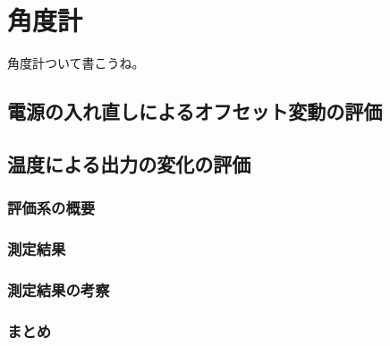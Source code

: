 \documentclass[../../main.tex]{subfiles}
\begin{document}
\chapter{角度計}
角度計ついて書こうね。
\section{電源の入れ直しによるオフセット変動の評価}
\section{温度による出力の変化の評価}
\subsection{評価系の概要}
\subsection{測定結果}
\subsection{測定結果の考察}
\subsection{まとめ}
\end{document}

